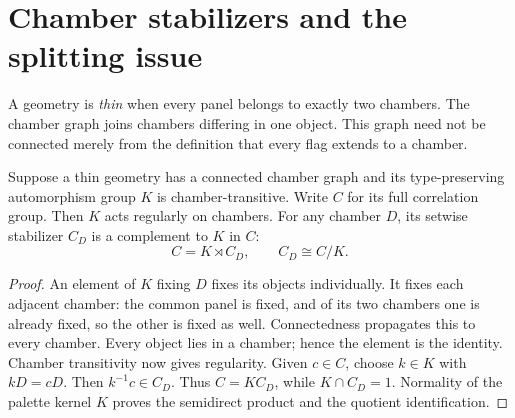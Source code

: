 \section{Chamber stabilizers and the splitting issue}
A geometry is \emph{thin} when every panel belongs to exactly two chambers.
The chamber graph joins chambers differing in one object. This graph need not
be connected merely from the definition that every flag extends to a chamber.

\begin{proposition}\label{UR.ThinSplit}
Suppose a thin geometry has a connected chamber graph and its type-preserving
automorphism group $K$ is chamber-transitive. Write $C$ for its full correlation
group. Then $K$ acts regularly on chambers. For any chamber $D$, its setwise
stabilizer $C_D$ is a complement to $K$ in $C$:
\[C=K\rtimes C_D,\qquad C_D\cong C/K.\]
\end{proposition}
\begin{proof}
An element of $K$ fixing $D$ fixes its objects individually. It fixes each
adjacent chamber: the common panel is fixed, and of its two chambers one is
already fixed, so the other is fixed as well. Connectedness propagates this
to every chamber. Every object lies in a chamber; hence the element is the
identity. Chamber transitivity now gives regularity. Given $c\in C$, choose
$k\in K$ with $kD=cD$. Then $k^{-1}c\in C_D$. Thus $C=KC_D$, while
$K\cap C_D=1$. Normality of the palette kernel $K$ proves the semidirect
product and the quotient identification.
\end{proof}

